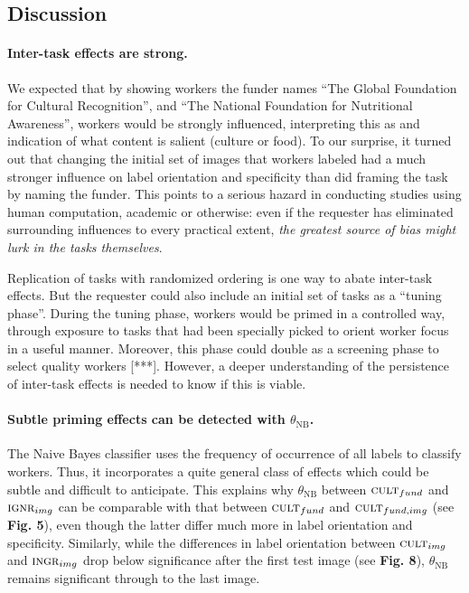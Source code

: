 \documentclass[a4paper]{report}
\begin{document}
\subsection*{Discussion}

\paragraph{Inter-task effects are strong.}  We expected that by showing
workers the funder names ``The Global Foundation for Cultural Recognition'',
and ``The National Foundation for Nutritional Awareness'', workers would 
be strongly influenced, interpreting this as and indication of what content 
is salient (culture or food).
To our surprise, it turned out that changing the initial set of images that
workers labeled had a much stronger influence on label orientation and 
specificity than did framing the task by naming the funder.
This points to a serious hazard in conducting studies using human computation,
academic or otherwise: even if the requester has 
eliminated surrounding influences to every practical extent, 
\textit{the greatest source of bias might lurk in the tasks themselves}.

Replication of tasks with randomized ordering is one way to abate inter-task
effects.  But the requester could also include an initial set of tasks as a 
``tuning phase''.  During the tuning phase, workers would be primed in a 
controlled way, through exposure to tasks that had been specially picked to
orient worker focus in a useful manner.  Moreover, this phase could double as a
screening phase to select quality workers [***].  However, a deeper 
understanding of the persistence of inter-task effects is needed to know if 
this is viable. 

\paragraph{Subtle priming effects can be detected with $\theta_\text{NB}$.}
The Naive Bayes classifier uses the frequency of occurrence of all labels to
classify workers.  Thus, it incorporates a quite general class of effects which
could be subtle and difficult to anticipate.  This explains why 
$\theta_\text{NB}$ 
between $\textsc{cult}_{fund}$ and $\textsc{ignr}_{img}$ can be comparable with
that between $\textsc{cult}_{fund}$ and $\textsc{cult}_{fund,img}$ 
(see \textbf{Fig. 5}), even though the latter differ much more in label 
orientation and specificity.  Similarly, while the differences in label
orientation between $\textsc{cult}_{img}$ and $\textsc{ingr}_{img}$ drop below 
significance after the first test image (see \textbf{Fig. 8}), 
$\theta_\text{NB}$ remains significant through to the last image.
\end{document}
